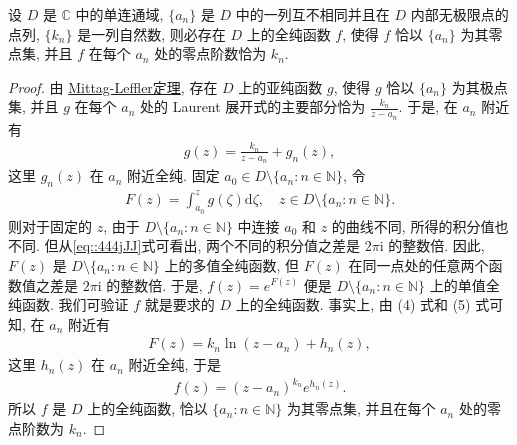 \documentclass[../../main.tex]{subfiles}%
\begin{document}
\begin{theorem}[Weierstrass因子分解定理]\label{theorem:Weierstrass因子分解定理}
设 \(D\) 是 \(\mathbb{C}\) 中的单连通域, \(\{a_n\}\) 是 \(D\) 中的一列互不相同并且在 \(D\) 内部无极限点的点列, \(\{k_n\}\) 是一列自然数, 则必存在 \(D\) 上的全纯函数 \(f\), 使得 \(f\) 恰以 \(\{a_n\}\) 为其零点集, 并且 \(f\) 在每个 \(a_n\) 处的零点阶数恰为 \(k_n\).
\end{theorem}
\begin{proof}
由 \hyperref[theorem:Mittag-Leffler定理]{Mittag-Leffler定理}, 存在 \(D\) 上的亚纯函数 \(g\), 使得 \(g\) 恰以 \(\{a_n\}\) 为其极点集, 并且 \(g\) 在每个 \(a_n\) 处的 Laurent 展开式的主要部分恰为 \(\frac{k_n}{z-a_n}\). 于是, 在 \(a_n\) 附近有
\begin{align}\label{eq::444jJJ}
g(z) = \frac{k_n}{z-a_n} + g_n(z),
\end{align}
这里 \(g_n(z)\) 在 \(a_n\) 附近全纯. 固定 \(a_0 \in D \setminus \{a_n: n \in \mathbb{N}\}\), 令
\begin{align*}
F(z) = \int_{a_0}^z g(\zeta) \mathrm{d}\zeta, \quad z \in D \setminus \{a_n: n \in \mathbb{N}\}.
\end{align*}
则对于固定的 \(z\), 由于 \(D \setminus \{a_n: n \in \mathbb{N}\}\) 中连接 \(a_0\) 和 \(z\) 的曲线不同, 所得的积分值也不同. 但从\eqref{eq::444jJJ}式可看出, 两个不同的积分值之差是 \(2\pi \mathrm{i}\) 的整数倍. 因此, \(F(z)\) 是 \(D \setminus \{a_n: n \in \mathbb{N}\}\) 上的多值全纯函数, 但 \(F(z)\) 在同一点处的任意两个函数值之差是 \(2\pi \mathrm{i}\) 的整数倍. 于是, \(f(z) = e^{F(z)}\) 便是 \(D \setminus \{a_n: n \in \mathbb{N}\}\) 上的单值全纯函数. 我们可验证 \(f\) 就是要求的 \(D\) 上的全纯函数. 事实上, 由 (4) 式和 (5) 式可知, 在 \(a_n\) 附近有
\begin{align*}
F(z) = k_n \ln(z-a_n) + h_n(z),
\end{align*}
这里 \(h_n(z)\) 在 \(a_n\) 附近全纯, 于是
\begin{align*}
f(z) = (z-a_n)^{k_n} e^{h_n(z)}.
\end{align*}
所以 \(f\) 是 \(D\) 上的全纯函数, 恰以 \(\{a_n: n \in \mathbb{N}\}\) 为其零点集, 并且在每个 \(a_n\) 处的零点阶数为 \(k_n\).
\end{proof}
\end{document}
